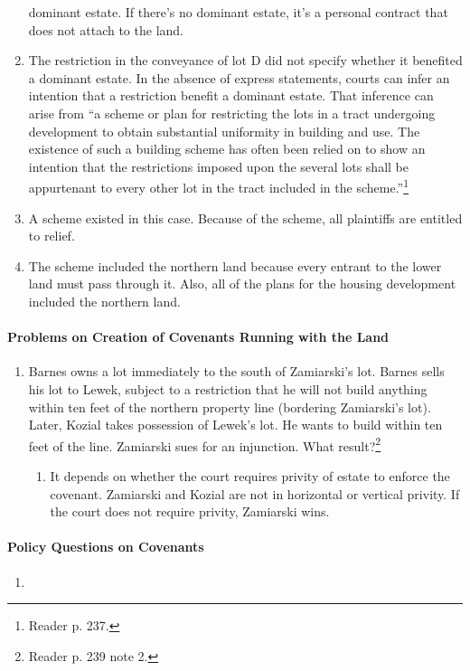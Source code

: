 \begin{enumerate}
    dominant estate. If there's no dominant estate, it's a personal contract 
    that does not attach to the land.
    \item The restriction in the conveyance of lot D did not specify whether 
    it benefited a dominant estate. In the absence of express statements, 
    courts can infer an intention that a restriction benefit a dominant 
    estate. That inference can arise from ``a scheme or plan for restricting 
    the lots in a tract undergoing development to obtain substantial 
    uniformity in building and use. The existence of such a building scheme 
    has often been relied on to show an intention that the restrictions 
    imposed upon the several lots shall be appurtenant to every other lot in 
    the tract included in the scheme.''\footnote{Reader p. 237.}
    \item A scheme existed in this case. Because of the scheme, all plaintiffs 
    are entitled to relief.
    \item The scheme included the northern land because every entrant to the 
    lower land must pass through it. Also, all of the plans for the housing 
    development included the northern land.
\end{enumerate}

\paragraph{Problems on Creation of Covenants Running with the Land}

\begin{enumerate}
    \item Barnes owns a lot immediately to the south of Zamiarski's lot. 
    Barnes sells his lot to Lewek, subject to a restriction that he will not 
    build anything within ten feet of the northern property line (bordering 
    Zamiarski's lot). Later, Kozial takes possession of Lewek's lot. He wants 
    to build within ten feet of the line. Zamiarski sues for an injunction. 
    What result?\footnote{Reader p. 239 note 2.}
    \begin{enumerate}
        \item It depends on whether the court requires privity of estate to 
        enforce the covenant. Zamiarski and Kozial are not in horizontal or 
        vertical privity. If the court does not require privity, Zamiarski 
        wins.
    \end{enumerate}
\end{enumerate}

\paragraph{Policy Questions on Covenants}

\begin{enumerate}
    \item %
\end{enumerate}

